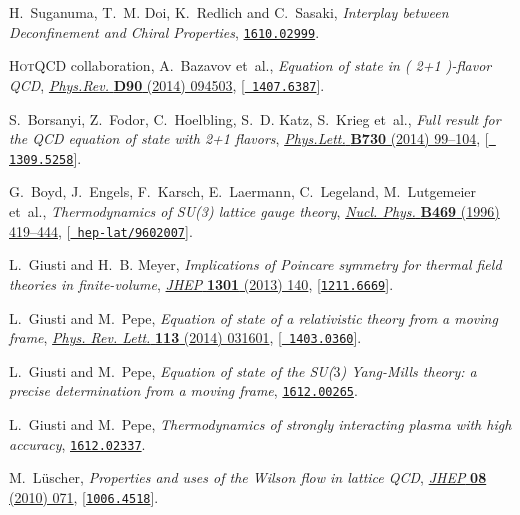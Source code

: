 \documentclass{PoS}
\begin{document}
\begin{thebibliography}{100}
H.~Suganuma, T.~M. Doi, K.~Redlich and C.~Sasaki, \emph{{Interplay between
  Deconfinement and Chiral Properties}},
  \href{https://arxiv.org/abs/1610.02999}{{\tt 1610.02999}}.

{\scshape HotQCD} collaboration, A.~Bazavov et~al., \emph{{Equation of state in
  ( 2+1 )-flavor QCD}},
  \href{http://dx.doi.org/10.1103/PhysRevD.90.094503}{\emph{Phys.Rev.} {\bf
  D90} (2014) 094503}, [\href{https://arxiv.org/abs/1407.6387}{{\tt
  1407.6387}}].

S.~Borsanyi, Z.~Fodor, C.~Hoelbling, S.~D. Katz, S.~Krieg et~al., \emph{{Full
  result for the QCD equation of state with 2+1 flavors}},
  \href{http://dx.doi.org/10.1016/j.physletb.2014.01.007}{\emph{Phys.Lett.}
  {\bf B730} (2014) 99--104}, [\href{https://arxiv.org/abs/1309.5258}{{\tt
  1309.5258}}].

G.~Boyd, J.~Engels, F.~Karsch, E.~Laermann, C.~Legeland, M.~Lutgemeier et~al.,
  \emph{{Thermodynamics of SU(3) lattice gauge theory}},
  \href{http://dx.doi.org/10.1016/0550-3213(96)00170-8}{\emph{Nucl. Phys.} {\bf
  B469} (1996) 419--444}, [\href{https://arxiv.org/abs/hep-lat/9602007}{{\tt
  hep-lat/9602007}}].

L.~Giusti and H.~B. Meyer, \emph{{Implications of Poincare symmetry for thermal
  field theories in finite-volume}},
  \href{http://dx.doi.org/10.1007/JHEP01(2013)140}{\emph{JHEP} {\bf 1301}
  (2013) 140}, [\href{https://arxiv.org/abs/1211.6669}{{\tt 1211.6669}}].

L.~Giusti and M.~Pepe, \emph{{Equation of state of a relativistic theory from a
  moving frame}},
  \href{http://dx.doi.org/10.1103/PhysRevLett.113.031601}{\emph{Phys. Rev.
  Lett.} {\bf 113} (2014) 031601}, [\href{https://arxiv.org/abs/1403.0360}{{\tt
  1403.0360}}].

L.~Giusti and M.~Pepe, \emph{{Equation of state of the SU($3$) Yang-Mills
  theory: a precise determination from a moving frame}},
  \href{https://arxiv.org/abs/1612.00265}{{\tt 1612.00265}}.

L.~Giusti and M.~Pepe, \emph{{Thermodynamics of strongly interacting plasma
  with high accuracy}},
\newblock \href{https://arxiv.org/abs/1612.02337}{{\tt 1612.02337}}.

M.~L{\"u}scher, \emph{{Properties and uses of the Wilson flow in lattice QCD}},
  \href{http://dx.doi.org/10.1007/JHEP08(2010)071,
  10.1007/JHEP03(2014)092}{\emph{JHEP} {\bf 08} (2010) 071},
  [\href{https://arxiv.org/abs/1006.4518}{{\tt 1006.4518}}].


\end{thebibliography}
\end{document}
